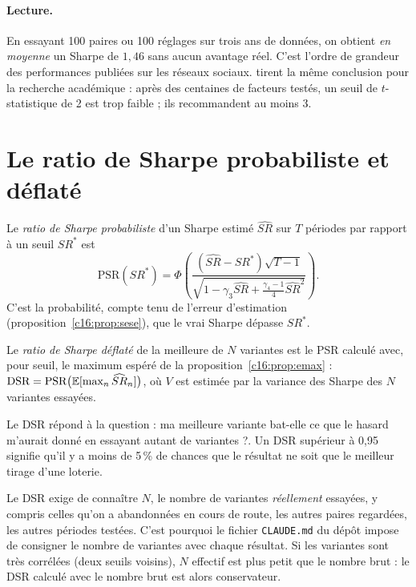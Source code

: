 \paragraph{Lecture.} En essayant 100 paires ou 100 réglages sur trois ans de données, on obtient \emph{en moyenne} un Sharpe de $1{,}46$ sans aucun avantage réel. C'est l'ordre de grandeur des performances publiées sur les réseaux sociaux. \citet{harvey2016} tirent la même conclusion pour la recherche académique : après des centaines de facteurs testés, un seuil de $t$-statistique de 2 est trop faible ; ils recommandent au moins 3.

\section{Le ratio de Sharpe probabiliste et déflaté}

\begin{definition}[PSR]
Le \emph{ratio de Sharpe probabiliste} d'un Sharpe estimé $\widehat{SR}$ sur $T$ périodes par rapport à un seuil $SR^\ast$ est
\[
\text{PSR}(SR^\ast) = \Phi\!\left(\frac{(\widehat{SR} - SR^\ast)\sqrt{T-1}}{\sqrt{1 - \gamma_3\widehat{SR} + \frac{\gamma_4-1}{4}\widehat{SR}^2}}\right).
\]
C'est la probabilité, compte tenu de l'erreur d'estimation (proposition~\ref{c16:prop:sese}), que le vrai Sharpe dépasse $SR^\ast$.
\end{definition}

\begin{definition}
Le \emph{ratio de Sharpe déflaté} de la meilleure de $N$ variantes est le PSR calculé avec, pour seuil, le maximum espéré de la proposition~\ref{c16:prop:emax} : $\text{DSR} = \text{PSR}\big(\mathbb{E}[\max_n \widehat{SR}_n]\big)$, où $V$ est estimée par la variance des Sharpe des $N$ variantes essayées.
\end{definition}

\begin{intuition}
Le DSR répond à la question : \og ma meilleure variante bat-elle ce que le hasard m'aurait donné en essayant autant de variantes ?\fg. Un DSR supérieur à 0,95 signifie qu'il y a moins de 5\,\% de chances que le résultat ne soit que le meilleur tirage d'une loterie.
\end{intuition}

\begin{pitfall}
Le DSR exige de connaître $N$, le nombre de variantes \emph{réellement} essayées, y compris celles qu'on a abandonnées en cours de route, les autres paires regardées, les autres périodes testées. C'est pourquoi le fichier \texttt{CLAUDE.md} du dépôt impose de consigner le nombre de variantes avec chaque résultat. Si les variantes sont très corrélées (deux seuils voisins), $N$ \og effectif\fg{} est plus petit que le nombre brut : le DSR calculé avec le nombre brut est alors conservateur.
\end{pitfall}

